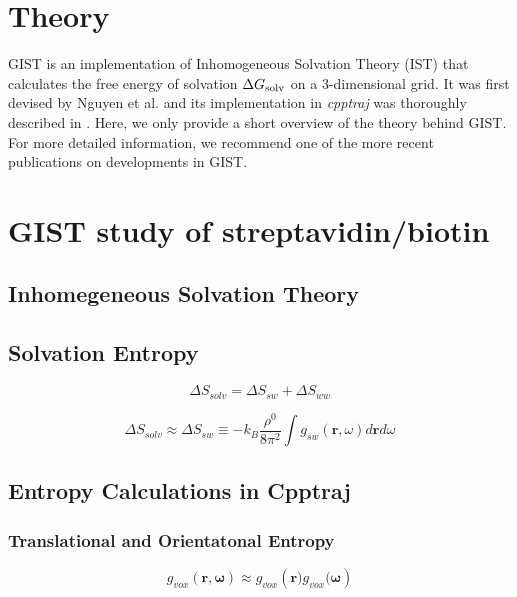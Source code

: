 \documentclass[9pt,tutorial]{livecoms}
\newcommand{\dgsolv}{\Delta G_\textup{solv}}
\newcommand{\software}{\emph}
\begin{document}
\section{Theory}
GIST is an implementation of Inhomogeneous Solvation Theory (IST) \cite{Lazaridis1998} that calculates the free energy of solvation $\dgsolv$ on a 3-dimensional grid.
It was first devised by Nguyen et al. \cite{Nguyen2012} and its implementation in \software{cpptraj} was thoroughly described in \cite{Ramsey2016}.
Here, we only provide a short overview of the theory behind GIST.
For more detailed information, we recommend one of the more recent publications on developments in GIST. \cite{Kraml2020}\cite{Chen2021}
\section{GIST study of streptavidin/biotin}

\subsection{Inhomegeneous Solvation Theory}

\subsection{Solvation Entropy}

\begin{equation}
    \Delta S_\textit{solv} = \Delta S_\textit{sw} + \Delta S_\textit{ww}
\end{equation}

\begin{equation}
    \Delta S_\textit{solv} \approx \Delta S_\textit{sw} \equiv -k_\textit{B} \frac{\rho^\textit{0}}{8\pi^\textit{2}} \int g_\textit{sw} \left(\textbf{r}, \omega \right) d\textbf{r}d\omega
\end{equation}

\subsection{Entropy Calculations in Cpptraj}
\subsubsection{Translational and Orientatonal Entropy}

\begin{equation}
    g_\textit{vox} \left( \textbf{r}, \mathbf{\omega} \right) \approx g_\textit{vox} \left( \textbf{r})g_\textit{vox}(\mathbf{\omega} \right)
\end{equation}
\end{document}
